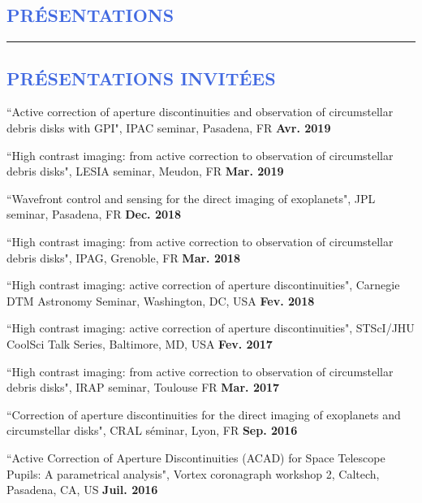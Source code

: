 \documentclass[11pt,a4paper, french]{article}
\begin{document}
%
%
\vspace{-0.8cm}
\textcolor{RoyalBlue}{\section{\large PRÉSENTATIONS}
\vspace{-0.2cm}\hrule}
\vspace{0.4cm}

\textcolor{RoyalBlue}{\subsection{\large PRÉSENTATIONS INVITÉES}}

\begin{etaremune}
\item ``Active correction of aperture discontinuities and observation of circumstellar debris disks with GPI", IPAC seminar, Pasadena, FR \textbf{Avr. 2019}

\item ``High contrast imaging: from active correction to observation of circumstellar debris disks", LESIA seminar, Meudon, FR \textbf{Mar. 2019}

\item ``Wavefront control and sensing for the direct imaging of exoplanets", JPL seminar, Pasadena, FR \textbf{Dec. 2018}

\item ``High contrast imaging: from active correction to observation of circumstellar debris disks", IPAG, Grenoble, FR \textbf{Mar. 2018}

\item ``High contrast imaging: active correction of aperture discontinuities", Carnegie DTM Astronomy Seminar, Washington, DC, USA \textbf{Fev. 2018}

\item ``High contrast imaging: active correction of aperture discontinuities", STScI/JHU CoolSci Talk Series, Baltimore, MD, USA \textbf{Fev. 2017}

\item ``High contrast imaging: from active correction to observation of circumstellar debris disks", IRAP seminar, Toulouse FR \textbf{Mar. 2017}

\item ``Correction of aperture discontinuities for the direct imaging of exoplanets and circumstellar disks", CRAL séminar, Lyon, FR \textbf{Sep. 2016}

\item ``Active Correction of Aperture Discontinuities (ACAD) for Space Telescope Pupils: A parametrical analysis", Vortex coronagraph workshop 2, Caltech, Pasadena, CA, US \textbf{Juil. 2016}
\end{etaremune}
\end{document}
